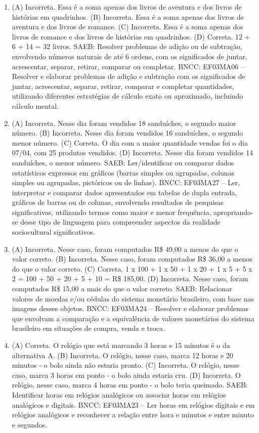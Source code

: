 \begin{enumerate}
\item
(A) Incorreta. Essa é a soma apenas dos livros de aventura e dos livros de histórias em quadrinhos.
(B) Incorreta. Essa é a soma apenas dos livros de aventura e dos livros de romance.
(C) Incorreta. Essa é a soma apenas dos livros de romance e dos livros de histórias em quadrinhos.
(D) Correta. 12 + 6 + 14 = 32 livros.
SAEB: Resolver problemas de adição ou de subtração,
envolvendo números naturais de até 6 ordens, com os significados de juntar, acrescentar, separar, retirar, comparar ou completar.
BNCC: EF03MA06 – Resolver e elaborar problemas de adição e subtração com os significados de
juntar, acrescentar, separar, retirar, comparar e completar quantidades, utilizando diferentes
estratégias de cálculo exato ou aproximado, incluindo cálculo mental.

\item
(A) Incorreta. Nesse dia foram vendidos 18 sanduíches, o segundo maior número.
(B) Incorreta. Nesse dia foram vendidos 16 sanduíches, o segundo menor número.
(C) Correta. O dia com a maior quantidade vendas foi o dia 07/04. com 25 produtos vendidos.
(D) Incorreta. Nesse dia foram vendidos 14 sanduíches, o menor número.
SAEB: Ler/identificar ou comparar dados estatísticos
expressos em gráficos (barras simples ou agrupadas, colunas simples ou
agrupadas, pictóricos ou de linhas).
BNCC: EF03MA27 -- Ler, interpretar e comparar dados apresentados em tabelas de dupla entrada,
gráficos de barras ou de colunas, envolvendo resultados de pesquisas significativas, utilizando
termos como maior e menor frequência, apropriando-se desse tipo de linguagem para
compreender aspectos da realidade sociocultural significativos.

\item
(A) Incorreta. Nesse caso, foram computados R\$ 49,00 a menos do que o valor correto.
(B) Incorreta. Nesse caso, foram computados R\$ 36,00 a menos do que o valor correto.
(C) Correta. 1 x 100 + 1 x 50 + 1 x 20 + 1 x 5 + 5 x 2 = 100 + 50 + 20 + 5 + 10 = R\$ 185,00.
(D) Incorreta. Nesse caso, foram computados R\$ 15,00 a mais do que o valor correto.
SAEB: Relacionar valores de moedas e/ou cédulas do sistema monetário brasileiro, com base nas imagens desses objetos.
BNCC: EF03MA24 -- Resolver e elaborar problemas que envolvam a comparação e a equivalência de
valores monetários do sistema brasileiro em situações de compra, venda e troca.

\item
(A) Correta. O relógio que está marcando 3 horas e 15 minutos é o da alternativa A.
(B) Incorreta. O relógio, nesse caso, marca 12 horas e 20 minutos - o bolo ainda não estaria pronto.
(C) Incorreta. O relógio, nesse caso, marca 3 horas em ponto - o bolo ainda estaria cru.
(D) Incorreta. O relógio, nesse caso, marca 4 horas em ponto - o bolo teria queimado.
SAEB: Identificar horas em relógios analógicos ou associar horas em relógios analógicos e digitais.
BNCC: EF03MA23 – Ler horas em relógios digitais e em relógios analógicos e reconhecer a relação
entre hora e minutos e entre minuto e segundos.


\end{enumerate}
